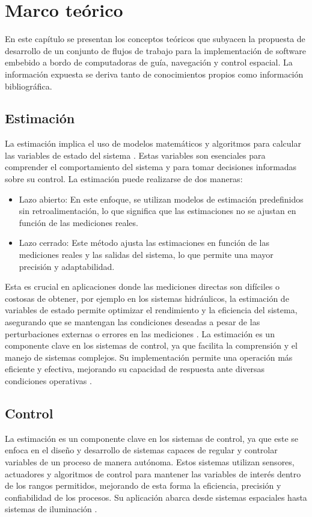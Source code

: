 \chapter{Marco teórico}
\label{ch:marco}

En este capítulo se presentan los conceptos teóricos que subyacen la propuesta de desarrollo de un conjunto de flujos de trabajo para la implementación de software embebido 
a bordo de computadoras de guía, navegación y control espacial. La información expuesta se deriva tanto de conocimientos propios como información bibliográfica.

\section{Estimación}
La estimación implica el uso de modelos matemáticos y algoritmos para calcular las variables de estado del sistema \cite{garrido1999identificacion}. Estas variables son esenciales para comprender 
el comportamiento del sistema y para tomar decisiones informadas sobre su control. La estimación puede realizarse de dos maneras:

\begin{itemize}
    \item Lazo abierto: En este enfoque, se utilizan modelos de estimación predefinidos sin retroalimentación, lo que significa que las estimaciones no se ajustan en función
    de las mediciones reales.
    \item Lazo cerrado: Este método ajusta las estimaciones en función de las mediciones reales y las salidas del sistema, lo que permite una mayor precisión y adaptabilidad.
\end{itemize}

Esta es crucial en aplicaciones donde las mediciones directas son difíciles o costosas de obtener, por ejemplo en los sistemas hidráulicos, la estimación de variables de 
estado permite optimizar el rendimiento y la eficiencia del sistema, asegurando que se mantengan las condiciones deseadas a pesar de las perturbaciones externas o errores en las 
mediciones \cite{Merchn2019EvaluacinDM}. La estimación es un componente clave en los sistemas de control, ya que facilita la comprensión y el manejo de sistemas complejos. 
Su implementación permite una operación más eficiente y efectiva, mejorando su capacidad de respuesta ante diversas condiciones operativas \cite{Mesa2020EstimacinDV}.

\section{Control}
La estimación es un componente clave en los sistemas de control, ya que este se enfoca en el diseño y desarrollo de sistemas capaces de regular y controlar variables de un proceso de manera autónoma. Estos sistemas utilizan sensores, actuadores y algoritmos de control para mantener las variables de interés dentro de los rangos permitidos, mejorando de esta forma la eficiencia, precisión y confiabilidad de los procesos. Su aplicación abarca desde sistemas espaciales hasta sistemas de iluminación \cite{smith1991control}. 


